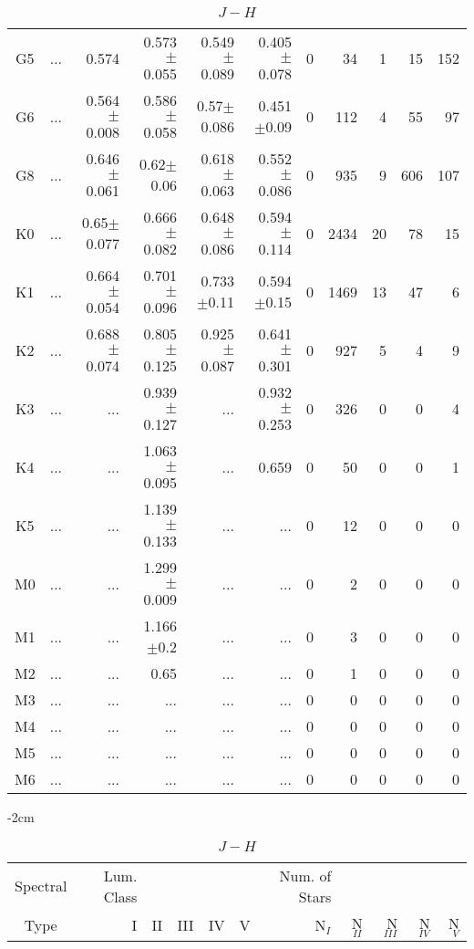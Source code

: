 \begin{table}[t]
\begin{table}[t]
\begin{center}
\begin{tabular}{c|rrrrr|rrrrr}
        G5	&	 ...	&	0.574	&	0.573$\pm$0.055	&	0.549$\pm$0.089	&	0.405$\pm$0.078	&	0	&	34	&	1	&	15	&	152	\\
        G6	&	 ...	&	0.564$\pm$0.008	&	0.586$\pm$0.058	&	0.57$\pm$0.086	&	0.451$\pm$0.09	&	0	&	112	&	4	&	55	&	97	\\
        G8	&	 ...	&	0.646$\pm$0.061	&	0.62$\pm$0.06	&	0.618$\pm$0.063	&	0.552$\pm$0.086	&	0	&	935	&	9	&	606	&	107	\\
        K0	&	 ...	&	0.65$\pm$0.077	&	0.666$\pm$0.082	&	0.648$\pm$0.086	&	0.594$\pm$0.114	&	0	&	2434	&	20	&	78	&	15	\\
        K1	&	 ...	&	0.664$\pm$0.054	&	0.701$\pm$0.096	&	0.733$\pm$0.11	&	0.594$\pm$0.15	&	0	&	1469	&	13	&	47	&	6	\\
        K2	&	 ...	&	0.688$\pm$0.074	&	0.805$\pm$0.125	&	0.925$\pm$0.087	&	0.641$\pm$0.301	&	0	&	927	&	5	&	4	&	9	\\
        K3	&	 ...	&	 ...	&	0.939$\pm$0.127	&	 ...	&	0.932$\pm$0.253	&	0	&	326	&	0	&	0	&	4	\\
        K4	&	 ...	&	 ...	&	1.063$\pm$0.095	&	 ...	&	0.659	&	0	&	50	&	0	&	0	&	1	\\
        K5	&	 ...	&	 ...	&	1.139$\pm$0.133	&	 ...	&	 ...	&	0	&	12	&	0	&	0	&	0	\\
        M0	&	 ...	&	 ...	&	1.299$\pm$0.009	&	 ...	&	 ...	&	0	&	2	&	0	&	0	&	0	\\
        M1	&	 ...	&	 ...	&	1.166$\pm$0.2	&	 ...	&	 ...	&	0	&	3	&	0	&	0	&	0	\\
        M2	&	 ...	&	 ...	&	0.65	&	 ...	&	 ...	&	0	&	1	&	0	&	0	&	0	\\
        M3	&	 ...	&	 ...	&	 ...	&	 ...	&	 ...	&	0	&	0	&	0	&	0	&	0	\\
        M4	&	 ...	&	 ...	&	 ...	&	 ...	&	 ...	&	0	&	0	&	0	&	0	&	0	\\
        M5	&	 ...	&	 ...	&	 ...	&	 ...	&	 ...	&	0	&	0	&	0	&	0	&	0	\\
        M6	&	 ...	&	 ...	&	 ...	&	 ...	&	 ...	&	0	&	0	&	0	&	0	&	0	\\
        \bottomrule
        \end{tabular}
    \end{center}
    \end{table}
    
    \begin{table}[t]
    \tiny
    \centering
    \caption{$J-H$}
    \begin{center}
        \addtolength{\leftskip} {-2cm}
        \addtolength{\rightskip}{-2cm}
        \begin{tabular}{c|rrrrr|rrrrr}
        \toprule
        Spectral & Lum. Class & & & & & Num. of Stars & & & &  \\
        Type & I & II & III &  IV & V & N$_{I}$ & N$_{II}$ & N$_{III}$ & N$_{IV}$ & N$_{V}$ \\ \midrule
    

\end{tabular}
\end{center}
\end{table}
\end{table}
